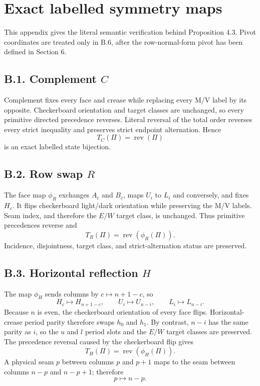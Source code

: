 \documentclass[11pt]{article}
\theoremstyle{definition}
\theoremstyle{remark}
\begin{document}
\appendix
\section{Exact labelled symmetry maps}\label{appendix-b.-exact-labelled-symmetry-maps}

This appendix gives the literal semantic verification behind Proposition
4.3. Pivot coordinates are treated only in B.6, after the
row-normal-form pivot has been defined in Section 6.

\subsection{\texorpdfstring{B.1. Complement
\(C\)}{B.1. Complement C}}\label{b.1.-complement-c}

Complement fixes every face and crease while replacing every M/V label
by its opposite. Checkerboard orientation and target classes are
unchanged, so every primitive directed precedence reverses. Literal
reversal of the total order reverses every strict inequality and
preserves strict endpoint alternation. Hence \[
T_C(\Pi)=\operatorname{rev}(\Pi)
\] is an exact labelled state bijection.

\subsection{\texorpdfstring{B.2. Row swap
\(R\)}{B.2. Row swap R}}\label{b.2.-row-swap-r}

The face map \(\phi_R\) exchanges \(A_c\) and \(B_c\), maps \(U_i\) to
\(L_i\) and conversely, and fixes \(H_c\). It flips checkerboard
light/dark orientation while preserving the M/V labels. Seam index, and
therefore the \(E/W\) target class, is unchanged. Thus primitive
precedences reverse and \[
T_R(\Pi)=\operatorname{rev}(\phi_R(\Pi)).
\] Incidence, disjointness, target class, and strict-alternation status
are preserved.

\subsection{\texorpdfstring{B.3. Horizontal reflection
\(H\)}{B.3. Horizontal reflection H}}\label{b.3.-horizontal-reflection-h}

The map \(\phi_H\) sends columns by \(c\mapsto n+1-c\), so \[
H_c\mapsto H_{n+1-c},\qquad
U_i\mapsto U_{n-i},\qquad
L_i\mapsto L_{n-i}.
\] Because \(n\) is even, the checkerboard orientation of every face
flips. Horizontal-crease period parity therefore swaps \(h_0\) and
\(h_1\). By contrast, \(n-i\) has the same parity as \(i\), so the \(u\)
and \(l\) period slots and the \(E/W\) target classes are preserved. The
precedence reversal caused by the checkerboard flip gives \[
T_H(\Pi)=\operatorname{rev}(\phi_H(\Pi)).
\] A physical seam \(p\) between columns \(p\) and \(p+1\) maps to the
seam between columns \(n-p\) and \(n-p+1\); therefore \[
p\longmapsto n-p.
\]
\end{document}
